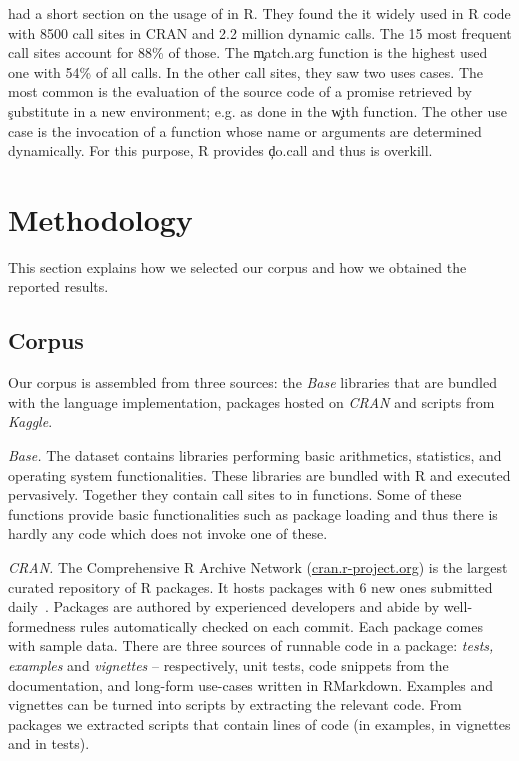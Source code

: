\documentclass[review,screen,acmsmall,anonymous=true]{acmart}
\newcommand{\mypara}[1]{\medskip\noindent\emph{#1}\xspace}
\begin{document}
\citet{ecoop12} had a short section on the usage of \eval in R. They found the
it widely used in R code with 8500 call sites in CRAN and 2.2 million dynamic
calls. The 15 most frequent call sites account for 88\% of those. The
\c{match.arg} function is the highest used one with 54\% of all calls. In the
other call sites, they saw two uses cases. The most common is the evaluation of
the source code of a promise retrieved by \c{substitute} in a new environment;
e.g. as done in the \c{with} function. The other use case is the invocation of a
function whose name or arguments are determined dynamically. For this purpose, R
provides \c{do.call} and thus \eval is overkill.


\section{Methodology}

This section explains how we selected our corpus and how we obtained the
reported results.

\subsection{Corpus}

Our corpus is assembled from three sources: the \emph{Base} libraries that are
bundled with the language implementation, packages hosted on \emph{CRAN} and
scripts from \emph{Kaggle}.

\mypara{Base.} The dataset contains \BasePackages libraries performing basic
arithmetics, statistics, and operating system functionalities. These libraries
are bundled with R and executed pervasively. Together they contain
\BaseEvalCallSites call sites to \eval in \BaseFunsWithEvals functions. Some of these
functions provide basic functionalities such as package loading and thus there
is hardly any code which does not invoke one of these.

\mypara{CRAN.} The Comprehensive R Archive Network
({\small \url{cran.r-project.org}}) is the largest curated repository of R
packages. It hosts \CranAvailablePackagesRnd packages with 6 new ones submitted
daily~\cite{Ligges2017}. Packages are authored by experienced developers and
abide by well-formedness rules automatically checked on each commit.
Each package comes with sample data. There are three sources of
runnable code in a package: \emph{tests, examples} and \emph{vignettes} --
respectively, unit tests, code snippets from the documentation, and long-form
use-cases written in RMarkdown. Examples and vignettes can be turned into
scripts by extracting the relevant code. From \CranPackages packages we
extracted \CranRunnableScripts scripts that contain \CranRunnableCode lines of
code (\CranRunnableCodeExamplesRnd in examples, \CranRunnableCodeVignettesRnd in
vignettes and \CranRunnableCodeTestsRnd in tests).
\end{document}

